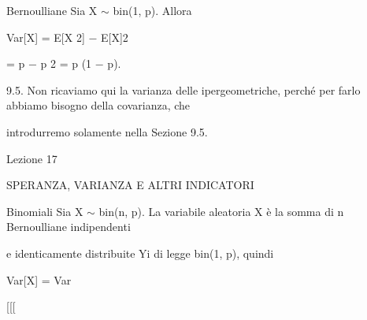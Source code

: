 \documentclass[a4paper,portrait,12pt]{article}
\begin{document}
\begin{flushleft}
Bernoulliane Sia X $\sim$ bin(1, p). Allora
\end{flushleft}


\begin{flushleft}
Var[X] = E[X 2] $-$ E[X]2
\end{flushleft}


\begin{flushleft}
= p $-$ p 2 = p (1 $-$ p).
\end{flushleft}


\begin{flushleft}
9.5. Non ricaviamo qui la varianza delle ipergeometriche, perch\'{e} per farlo abbiamo bisogno della covarianza, che
\end{flushleft}


\begin{flushleft}
introdurremo solamente nella Sezione 9.5.
\end{flushleft}





\begin{flushleft}
Lezione 17
\end{flushleft}










\begin{flushleft}
SPERANZA, VARIANZA E ALTRI INDICATORI
\end{flushleft}





\begin{flushleft}
Binomiali Sia X $\sim$ bin(n, p). La variabile aleatoria X \`{e} la somma di n Bernoulliane indipendenti
\end{flushleft}


\begin{flushleft}
e identicamente distribuite Yi di legge bin(1, p), quindi
\end{flushleft}


\begin{flushleft}
Var[X] = Var
\end{flushleft}





[[[
\end{document}
